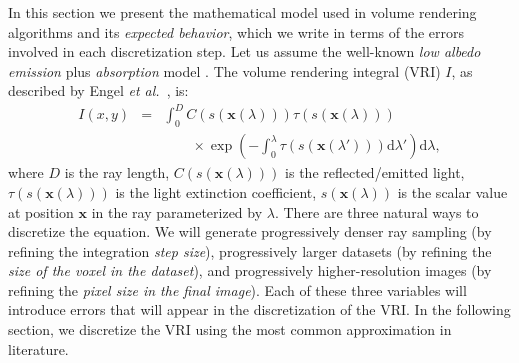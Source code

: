 In this section we present the mathematical model used in volume
rendering algorithms and its \emph{expected behavior}, which we write
in terms of the errors involved in each discretization step.  Let us
assume the well-known \emph{low albedo} \emph{emission} plus
\emph{absorption} model \cite{Max95}.  The volume rendering integral
(VRI) $I$, as described by Engel \emph{et al.}~\cite{Engel01}, is:
\begin{eqnarray}
I(x,y) &=& \int_0^D C(s(\mathbf{x}(\lambda)))
\tau(s(\mathbf{x}(\lambda))) \nonumber \\
&& \label{eq:emission_absorption}  \qquad \times \exp\left(-\int_0^\lambda
\tau(s(\mathbf{x}(\lambda'))) \mathrm{d}\lambda'\right)\mathrm{d}\lambda,
\label{eq:volume-rendering-equation}
\end{eqnarray}
where $D$ is the ray length, $C(s(\mathbf{x}(\lambda)))$ is the
reflected/emitted light, $\tau(s(\mathbf{x}(\lambda)))$ is the light
extinction coefficient, $s(\mathbf{x}(\lambda))$ is the scalar value
at position $\mathbf{x}$ in the ray parameterized by $\lambda$.  There
are three natural ways to discretize the equation. We will generate
progressively denser ray sampling (by refining the integration
\emph{step size}), progressively larger datasets (by refining the
\emph{size of the voxel in the dataset}), and progressively
higher-resolution images (by refining the \emph{pixel size in the
  final image}). Each of these three variables will introduce errors
that will appear in the discretization of the VRI. 
In the following section, we discretize the VRI using
the most common approximation in literature.


